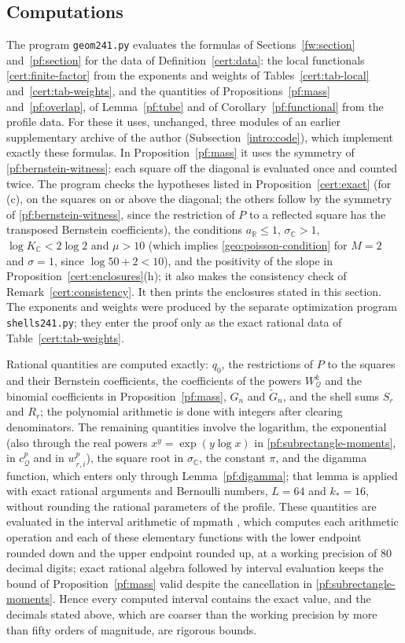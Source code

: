 \documentclass[11pt]{amsart}
\numberwithin{equation}{section}
\theoremstyle{definition}
\theoremstyle{remark}
\newcommand{\R}{\mathbb R}
\newcommand{\C}{\mathbb C}
\begin{document}
\subsection{Computations}\label{cert:computations}
The program \texttt{geom241.py} evaluates the formulas of
Sections~\ref{fw:section} and~\ref{pf:section} for the data of
Definition~\ref{cert:data}: the local functionals
\eqref{cert:finite-factor} from the exponents and weights of
Tables~\ref{cert:tab-local} and~\ref{cert:tab-weights}, and the
quantities of Propositions~\ref{pf:mass} and~\ref{pf:overlap}, of
Lemma~\ref{pf:tube} and of Corollary~\ref{pf:functional} from the
profile data. For these it uses, unchanged, three modules of an earlier
supplementary archive of the author (Subsection~\ref{intro:code}), which
implement exactly these formulas. In Proposition~\ref{pf:mass} it uses
the symmetry of \eqref{pf:bernstein-witness}: each square off the
diagonal is evaluated once and counted twice. The program checks the
hypotheses listed in Proposition~\ref{cert:exact} (for (c), on the
squares on or above the diagonal; the others follow by the symmetry of
\eqref{pf:bernstein-witness}, since the restriction of $P$ to a reflected
square has the transposed Bernstein coefficients), the conditions
$a_\R\le1$, $\sigma_\C>1$, $\log K_\C<2\log2$ and $\mu>10$ (which
implies \eqref{geo:poisson-condition} for $M=2$ and $\sigma=1$, since
$\log50+2<10$), and the positivity of the slope in
Proposition~\ref{cert:enclosures}(h); it also makes the consistency
check of Remark~\ref{cert:consistency}. It then prints the enclosures
stated in this section. The exponents and weights were produced by the
separate optimization program \texttt{shells241.py}; they enter the
proof only as the exact rational data of Table~\ref{cert:tab-weights}.

Rational quantities are computed exactly: $q_0$, the restrictions of
$P$ to the squares and their Bernstein coefficients, the coefficients
of the powers $W_{\mathcal Q}^k$ and the binomial coefficients in
Proposition~\ref{pf:mass}, $G_n$ and $\widetilde G_n$, and the shell
sums $S_r$ and $R_r$; the polynomial arithmetic is done with integers
after clearing denominators. The remaining quantities involve the
logarithm, the exponential (also through the real powers
$x^y=\exp(y\log x)$ in \eqref{pf:subrectangle-moments}, in
$c_{\mathcal Q}^p$ and in $w_{r,i}^p$), the square root in $\sigma_\C$,
the constant $\pi$, and the digamma function, which enters only through
Lemma~\ref{pf:digamma}; that lemma is applied with exact rational
arguments and Bernoulli numbers, $L=64$ and $k_*=16$, without rounding
the rational parameters of the profile. These quantities are evaluated
in the interval arithmetic of mpmath \cite{Mpmath}, which computes each
arithmetic operation and each of these elementary functions with the
lower endpoint rounded down and the upper endpoint rounded up, at a
working precision of $80$ decimal digits; exact rational algebra
followed by interval evaluation keeps the bound of
Proposition~\ref{pf:mass} valid despite the cancellation in
\eqref{pf:subrectangle-moments}. Hence every computed interval contains
the exact value, and the decimals stated above, which are coarser than
the working precision by more than fifty orders of magnitude, are
rigorous bounds.
\end{document}
